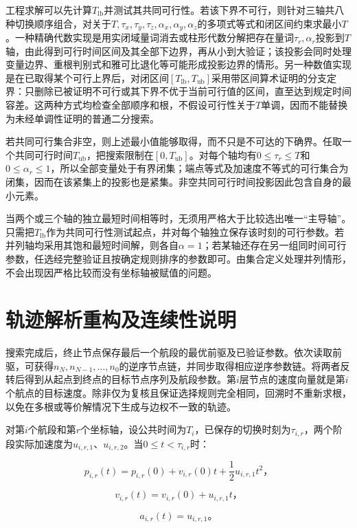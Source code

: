 \documentclass[UTF8,a4paper,12pt,fontset=fandol]{ctexart}
\begin{document}
工程求解可以先计算\(T_{\mathrm{lb}}\)并测试其共同可行性。若该下界不可行，则针对三轴共八种切换顺序组合，对关于\(T,\tau_x,\tau_y,\tau_z,\alpha_x,\alpha_y,\alpha_z\)的多项式等式和闭区间约束求最小\(T\)。一种精确代数实现是用实闭域量词消去或柱形代数分解把存在量词\(\tau_r,\alpha_r\)投影到\(T\)轴，由此得到可行时间区间及其全部下边界，再从小到大验证；该投影会同时处理变量边界、重根判别式和雅可比退化等可能形成投影边界的情形。另一种数值实现是在已取得某个可行上界后，对闭区间\([T_{\mathrm{lb}},T_{\mathrm{ub}}]\)采用带区间算术证明的分支定界：只删除已被证明不可行或其下界不优于当前可行值的区间，直至达到规定时间容差。这两种方式均检查全部顺序和根，不假设可行性关于\(T\)单调，因而不能替换为未经单调性证明的普通二分搜索。

若共同可行集合非空，则上述最小值能够取得，而不只是不可达的下确界。任取一个共同可行时间\(T_{\mathrm{ub}}\)，把搜索限制在\([0,T_{\mathrm{ub}}]\)。对每个轴均有\(0\le\tau_r\le T\)和\(0\le\alpha_r\le1\)，所以全部变量处于有界闭集；端点等式及加速度不等式的可行集合为闭集，因而在该紧集上的投影也是紧集。非空共同可行时间投影因此包含自身的最小元素。

当两个或三个轴的独立最短时间相等时，无须用严格大于比较选出唯一“主导轴”。只需把\(T_{\mathrm{lb}}\)作为共同可行性测试起点，并对每个轴独立保存该时刻的可行参数。若并列轴均采用其饱和最短时间解，则各自\(\alpha=1\)；若某轴还存在另一组同时间可行参数，任选经完整验证且按确定规则排序的参数即可。由集合定义处理并列情形，不会出现因严格比较而没有坐标轴被赋值的问题。

\section{轨迹解析重构及连续性说明}

搜索完成后，终止节点保存最后一个航段的最优前驱及已验证参数。依次读取前驱，可获得\(n_N,n_{N-1},\ldots,n_0\)的逆序节点链，并同步取得相应逆序参数链。将两者反转后得到从起点到终点的目标节点序列及航段参数。第\(i\)层节点的速度向量就是第\(i\)个航点的目标速度。除非仅为复核且保证选择规则完全相同，回溯时不重新求根，以免在多根或等价解情况下生成与边权不一致的轨迹。

对第\(i\)个航段和第\(r\)个坐标轴，设公共时间为\(T_i\)，已保存的切换时刻为\(\tau_{i,r}\)，两个阶段实际加速度为\(u_{i,r,1}\)、\(u_{i,r,2}\)。当\(0\le t<\tau_{i,r}\)时：

\[
p_{i,r}(t)=p_{i,r}(0)+v_{i,r}(0)t+\frac12u_{i,r,1}t^2\text{，}
\]

\[
v_{i,r}(t)=v_{i,r}(0)+u_{i,r,1}t\text{，}
\]

\[
a_{i,r}(t)=u_{i,r,1}\text{。}
\]
\end{document}
